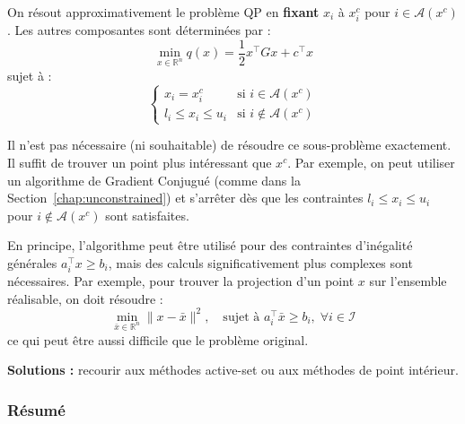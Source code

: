 On résout approximativement le problème QP en \textbf{fixant} $x_i$ à $x_i^c$ pour $i \in \mathcal{A}(x^c)$.
Les autres composantes sont déterminées par :
\begin{equation}
    \min_{x \in \mathbb{R}^n} q(x) = \frac{1}{2} x^\top G x + c^\top x
\end{equation}
sujet à :
\begin{equation}
    \begin{cases}
        x_i = x_i^c & \text{si } i \in \mathcal{A}(x^c) \\
        l_i \le x_i \le u_i & \text{si } i \notin \mathcal{A}(x^c)
    \end{cases}
\end{equation}

\begin{remarque}
    Il n'est pas nécessaire (ni souhaitable) de résoudre ce sous-problème exactement. Il suffit de trouver un point plus intéressant que $x^c$.
    Par exemple, on peut utiliser un algorithme de Gradient Conjugué (comme dans la Section~\ref{chap:unconstrained}) et s'arrêter dès que les contraintes $l_i \le x_i \le u_i$ pour $i \notin \mathcal{A}(x^c)$ sont satisfaites.
\end{remarque}

\begin{remarque}
    En principe, l'algorithme peut être utilisé pour des contraintes d'inégalité générales $a_i^\top x \ge b_i$, mais des calculs significativement plus complexes sont nécessaires.
    Par exemple, pour trouver la projection d'un point $x$ sur l'ensemble réalisable, on doit résoudre :
    \begin{equation}
        \min_{\bar{x} \in \mathbb{R}^n} \|x - \bar{x}\|^2, \quad \text{sujet à } a_i^\top \bar{x} \ge b_i, \; \forall i \in \mathcal{I}
    \end{equation}
    ce qui peut être aussi difficile que le problème original.
    
    \textbf{Solutions :} recourir aux méthodes active-set ou aux méthodes de point intérieur.
\end{remarque}

\subsubsection{Résumé}

